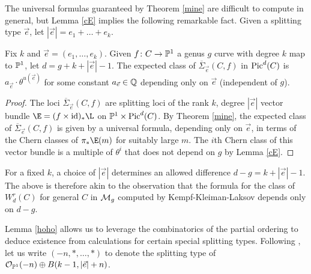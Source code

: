 The universal formulas guaranteed by Theorem \ref{mine} are difficult to compute in general, but Lemma \ref{cE} implies the following remarkable fact.
 Given a splitting type $\vec{e}$, let $|\vec{e}| = e_1 + \ldots + e_k$.


\begin{Lemma}
\notready \label{hoho}
Fix $k$ and $\vec{e} = (e_1, \ldots, e_k)$. Given $f\colon  C \rightarrow \mathbb{P}^1$ a genus $g$ curve with degree $k$ map to $\mathbb{P}^1$, let $d = g+k+ |\vec{e}| - 1$.
The expected class of $\overline{\Sigma}_{\vec{e}}(C,f)$ in $\operatorname{Pic}^d(C)$ is $a_{\vec{e}} \cdot \theta^{u(\vec{e})}$ for some constant $a_{\vec{e}} \in \mathbb{Q}$ depending only on $\vec{e}$ (independent of $g$).
\end{Lemma}
\begin{proof}
The loci $\overline{\Sigma}_{\vec{e}}(C,f)$ are splitting loci of the rank $k$, degree $|\vec{e}|$ vector bundle $\E = (f \times \mathrm{id})_* \L$ on $\mathbb{P}^1 \times \operatorname{Pic}^d(C)$.
By Theorem \ref{mine}, the expected class of $\overline{\Sigma}_{\vec{e}}(C,f)$ is given by a universal formula, depending only on $\vec{e}$, in terms of the Chern classes of $\pi_* \E(m)$ for suitably large $m$. The $i$th Chern class of this vector bundle is a multiple of $\theta^i$ that does not depend on $g$ by Lemma \ref{cE}.
\end{proof}

\begin{remark}
\notready
For a fixed $k$, a choice of $|\vec{e}|$ determines an allowed difference $d - g = k+|\vec{e}| - 1$. The above is therefore akin to the observation that the formula for the class of $W^r_d(C)$ for general $C$ in $\mathcal{M}_g$ computed by Kempf-Kleiman-Laksov \cite{K,KL1,KL2} depends only on $d - g$.
\end{remark}

Lemma \ref{hoho} allows us to leverage the combinatorics of the partial ordering to deduce existence from calculations for certain special splitting types. Following \cite{L}, let us write $(-n, *, \ldots, *)$ to denote the splitting type of $\mathcal{O}_{\mathbb{P}^1}(-n) \oplus B(k-1, |\vec{e}|+n)$.

